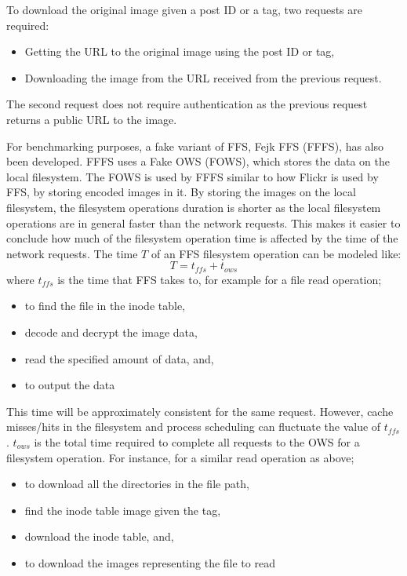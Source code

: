 To download the original image given a post ID or a tag, two requests are required:
\begin{itemize}
	\item Getting the URL to the original image using the post ID or tag,
	\item Downloading the image from the URL received from the previous request.
\end{itemize}
The second request does not require authentication as the previous request returns a public URL to the image. 

For benchmarking purposes, a fake variant of FFS, Fejk FFS (\gls{FFFS}), has also been developed. FFFS uses a Fake OWS (\gls{FOWS}), which stores the data on the local filesystem. The FOWS is used by FFFS similar to how Flickr is used by FFS, by storing encoded images in it. By storing the images on the local filesystem, the filesystem operations duration is shorter as the local filesystem operations are in general faster than the network requests. This makes it easier to conclude how much of the filesystem operation time is affected by the time of the network requests. The time $T$ of an FFS filesystem operation can be modeled like:
$$
	T = t_{ffs} + t_{ows}
$$
where $t_{ffs}$ is the time that FFS takes to, for example for a file read operation;
\begin{itemize}
	\item to find the file in the inode table,
	\item decode and decrypt the image data,
	\item read the specified amount of data, and,
	\item to output the data
\end{itemize}
This time will be approximately consistent for the same request. However, cache misses/hits in the filesystem and process scheduling can fluctuate the value of $t_{ffs}$. $t_{ows}$ is the total time required to complete all requests to the OWS for a filesystem operation. For instance, for a similar read operation as above;
\begin{itemize}
	\item to download all the directories in the file path,
	\item find the inode table image given the tag,
	\item download the inode table, and,
	\item to download the images representing the file to read
\end{itemize}
